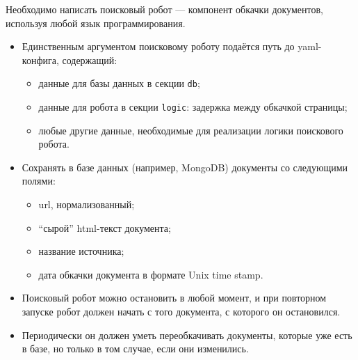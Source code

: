 
Необходимо написать поисковый робот --- компонент обкачки документов, используя
любой язык программирования.

\begin{itemize}
    \item Единственным аргументом поисковому роботу подаётся путь до
    yaml-конфига, содержащий:
    \begin{itemize}
        \item данные для базы данных в секции \texttt{db};
        \item данные для робота в секции \texttt{logic}: задержка между
        обкачкой страницы;
        \item любые другие данные, необходимые для реализации логики
        поискового робота.
    \end{itemize}
    \item Сохранять в базе данных (например, MongoDB) документы со следующими
    полями:
    \begin{itemize}
        \item url, нормализованный;
        \item \enquote{сырой} html-текст документа;
        \item название источника;
        \item дата обкачки документа в формате Unix time stamp.
    \end{itemize}
    \item Поисковый робот можно остановить в любой момент, и при повторном
    запуске робот должен начать с того документа, с которого он остановился.
    \item Периодически он должен уметь переобкачивать документы, которые уже
    есть в базе, но только в том случае, если они изменились.
\end{itemize}

\pagebreak
